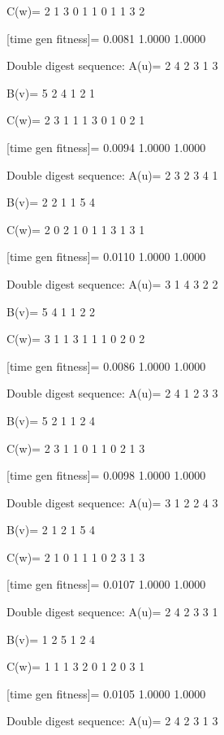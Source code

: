 C(w)=
     2     1     3     0     1     1     0     1     1     3     2

[time gen fitness]=
    0.0081    1.0000    1.0000

Double digest sequence:
A(u)=
     2     4     2     3     1     3

B(v)=
     5     2     4     1     2     1

C(w)=
     2     3     1     1     1     3     0     1     0     2     1

[time gen fitness]=
    0.0094    1.0000    1.0000

Double digest sequence:
A(u)=
     2     3     2     3     4     1

B(v)=
     2     2     1     1     5     4

C(w)=
     2     0     2     1     0     1     1     3     1     3     1

[time gen fitness]=
    0.0110    1.0000    1.0000

Double digest sequence:
A(u)=
     3     1     4     3     2     2

B(v)=
     5     4     1     1     2     2

C(w)=
     3     1     1     3     1     1     1     0     2     0     2

[time gen fitness]=
    0.0086    1.0000    1.0000

Double digest sequence:
A(u)=
     2     4     1     2     3     3

B(v)=
     5     2     1     1     2     4

C(w)=
     2     3     1     1     0     1     1     0     2     1     3

[time gen fitness]=
    0.0098    1.0000    1.0000

Double digest sequence:
A(u)=
     3     1     2     2     4     3

B(v)=
     2     1     2     1     5     4

C(w)=
     2     1     0     1     1     1     0     2     3     1     3

[time gen fitness]=
    0.0107    1.0000    1.0000

Double digest sequence:
A(u)=
     2     4     2     3     3     1

B(v)=
     1     2     5     1     2     4

C(w)=
     1     1     1     3     2     0     1     2     0     3     1

[time gen fitness]=
    0.0105    1.0000    1.0000

Double digest sequence:
A(u)=
     2     4     2     3     1     3

